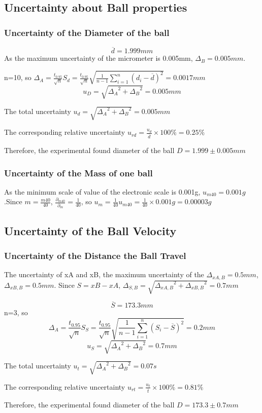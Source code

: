 \documentclass[12pt,a4paper]{article}
\begin{document}
\subsection{Uncertainty about Ball properties}

\subsubsection{Uncertainty of the Diameter of the ball}
$$\overline{d}=1.999mm$$
As the maximum uncertainty of the micrometer is 0.005mm, $\Delta_B=0.005mm$. \par 
n=10, so $\Delta_A=\frac{t_{0.95}}{\sqrt{n}}S_d=\frac{t_{0.95}}{\sqrt{n}}\sqrt{\frac{1}{n-1}\sum^n_{i=1}(d_i-\overline{d})^2}=0.0017mm$
$$u_D=\sqrt{{\Delta_A}^2+{\Delta_B}^2}=0.005mm$$ \par
The total uncertainty $u_d=\sqrt{{\Delta_A}^2+{\Delta_B}^2}=0.005mm$\par 
The corresponding relative uncertainty $u_{rd}=\frac{u_d}{\overline{d}}\times 100\%=0.25\%$ \par 
Therefore, the experimental found diameter of the ball $D=1.999 \pm 0.005mm$

\subsubsection{Uncertainty of the Mass of one ball}
As the minimum scale of value of the electronic scale is 0.001g, $u_{m40}=0.001g$.Since $m=\frac{m40}{40}$, $\frac{\partial_{m40}}{\partial_m}=\frac{1}{40}$, so $u_m=\frac{1}{40}u_{m40}=\frac{1}{40}\times 0.001g=0.00003g$

\subsection{Uncertainty of the Ball Velocity}
\subsubsection{Uncertainty of the Distance the Ball Travel}
The uncertainty of xA and xB, the maximum uncertainty of the $\Delta_{xA,B}=0.5mm$, $\Delta_{xB,B}=0.5mm$. Since $S=xB-xA$, $\Delta_{S,B}=\sqrt{{\Delta_{xA,B}}^2+{\Delta_{xB,B}}^2}=0.7mm$ \par 
$$\overline{S}=173.3mm$$
n=3, so $$\Delta_A=\frac{t_{0.95}}{\sqrt{n}}S_S=\frac{t_{0.95}}{\sqrt{n}}\sqrt{\frac{1}{n-1}\sum^n_{i=1}(S_i-\overline{S})^2}=0.2mm$$
$$u_S=\sqrt{{\Delta_A}^2+{\Delta_B}^2}=0.7mm$$ \par
The total uncertainty $u_t=\sqrt{{\Delta_A}^2+{\Delta_B}^2}=0.07s$\par 
The corresponding relative uncertainty $u_{rt}=\frac{u_t}{\overline{t}}\times 100\%=0.81\%$ \par 
Therefore, the experimental found diameter of the ball $D=173.3\pm 0.7mm$
\end{document}
